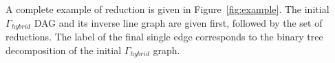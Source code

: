  
 

A complete example of reduction is given in Figure~\ref{fig:example}. The initial $\Gamma_{hybrid}$ DAG and its inverse line graph are given first, followed by the set of reductions. The label of the final single edge corresponds to the binary tree decomposition of the initial $\Gamma_{hybrid}$ graph. 

